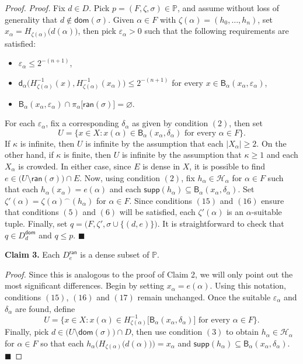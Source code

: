 \documentclass{amsart}
\theoremstyle{plain}
\theoremstyle{definition}
\newcommand{\dom}{\mathsf{dom}}
\newcommand{\ran}{\mathsf{ran}}
\newcommand{\di}{\mathsf{d}}
\newcommand{\Ball}{\mathsf{B}}
\newcommand{\supp}{\mathsf{supp}}
\newcommand{\HH}{\mathcal{H}}
\newcommand{\PPP}{\mathbb{P}}
\begin{document}
\begin{proof}
\noindent\textit{Proof.} Fix $d\in D$. Pick $p=(F,\zeta,\sigma)\in\PPP$, and assume without loss of generality that $d\notin\dom(\sigma)$. Given $\alpha\in F$ with $\zeta(\alpha)=(h_0,\ldots,h_n)$, set $x_\alpha=H_{\zeta(\alpha)}\big(d(\alpha)\big)$, then pick $\varepsilon_\alpha >0$ such that the following requirements are satisfied:
\begin{itemize}
\item[(15)] $\varepsilon_\alpha\leq 2^{-(n+1)}$,
\item[(16)] $\di_\alpha\big(H^{-1}_{\zeta(\alpha)}(x),H^{-1}_{\zeta(\alpha)}(x_\alpha)\big)\leq 2^{-(n+1)}$ for every $x\in\Ball_\alpha(x_\alpha,\varepsilon_\alpha)$,
\item[(17)] $\Ball_\alpha(x_\alpha,\varepsilon_\alpha)\cap\pi_\alpha\big[\ran(\sigma)\big]=\varnothing$.
\end{itemize}
For each $\varepsilon_\alpha$, fix a corresponding $\delta_\alpha$ as given by condition $(2)$, then set
$$
U=\{x\in X:x(\alpha)\in\Ball_\alpha(x_\alpha,\delta_\alpha)\text{ for every }\alpha\in F\}.
$$
If $\kappa$ is infinite, then $U$ is infinite by the assumption that each $|X_\alpha|\geq 2$. On the other hand, if $\kappa$ is finite, then $U$ is infinite by the assumption that $\kappa\geq 1$ and each $X_\alpha$ is crowded. In either case, since $E$ is dense in $X$, it is possible to find $e\in \big(U\setminus\ran(\sigma)\big)\cap E$. Now, using condition $(2)$, fix $h_\alpha\in\HH_\alpha$ for $\alpha\in F$ such that each $h_\alpha(x_\alpha)=e(\alpha)$ and each $\supp(h_\alpha)\subseteq\Ball_\alpha(x_\alpha,\delta_\alpha)$. Set $\zeta'(\alpha)=\zeta(\alpha)^\frown (h_\alpha)$ for $\alpha\in F$. Since conditions $(15)$ and $(16)$ ensure that conditions $(5)$ and $(6)$ will be satisfied, each $\zeta'(\alpha)$ is an $\alpha$-suitable tuple. Finally, set $q=\big(F,\zeta',\sigma\cup\{(d,e)\}\big)$. It is straightforward to check that $q\in D^\dom_d$ and $q\leq p$. $\blacksquare$

\noindent\textbf{Claim 3.} Each $D^\ran_e$ is a dense subset of $\PPP$.

\noindent\textit{Proof.} Since this is analogous to the proof of Claim 2, we will only point out the most significant differences. Begin by setting $x_\alpha=e(\alpha)$. Using this notation, conditions $(15)$, $(16)$ and $(17)$ remain unchanged. Once the suitable $\varepsilon_\alpha$ and $\delta_\alpha$ are found, define
$$
U=\big\{x\in X:x(\alpha)\in H^{-1}_{\zeta(\alpha)}\big[\Ball_\alpha(x_\alpha,\delta_\alpha)\big]\text{ for every }\alpha\in F\big\}.
$$
Finally, pick $d\in\big(U\setminus\dom(\sigma)\big)\cap D$, then use condition $(3)$ to obtain $h_\alpha\in\HH_\alpha$ for $\alpha\in F$ so that each $h_\alpha\Big(H_{\zeta(\alpha)}\big(d(\alpha)\big)\Big)=x_\alpha$ and $\supp(h_\alpha)\subseteq\Ball_\alpha(x_\alpha,\delta_\alpha)$. $\blacksquare$


\end{proof}
\end{document}
